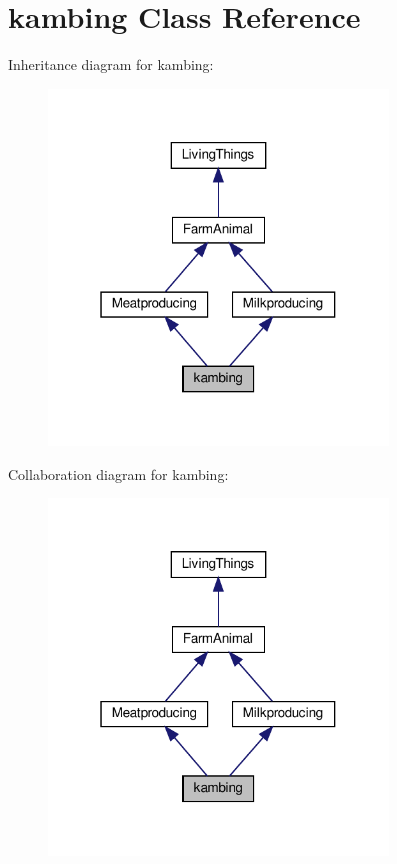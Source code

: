 \hypertarget{classkambing}{}\section{kambing Class Reference}
\label{classkambing}


Inheritance diagram for kambing\+:
\nopagebreak
\begin{figure}[H]
\begin{center}
\leavevmode
\includegraphics[width=256pt]{classkambing__inherit__graph}
\end{center}
\end{figure}


Collaboration diagram for kambing\+:
\nopagebreak
\begin{figure}[H]
\begin{center}
\leavevmode
\includegraphics[width=256pt]{classkambing__coll__graph}
\end{center}
\end{figure}
